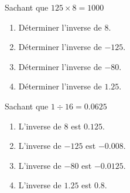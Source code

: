 \begin{exercice*}
    Sachant que $125\times 8 = \num{1000}$    
        \begin{enumerate}
            \item Déterminer l'inverse de $8$.
            \item Déterminer l'inverse de $-125$.
            \item Déterminer l'inverse de $-80$.
            \item Déterminer l'inverse de $\num{1.25}$.
        \end{enumerate}
\end{exercice*}
\begin{corrige}
    Sachant que $1\div 16 = \num{0.0625}$    
        \begin{enumerate}
            \item L'inverse de $8$ est $\num{0.125}$.
            \item L'inverse de $-125$ est $-\num{0.008}$.
            \item L'inverse de $-80$ est $-\num{0.0125}$.
            \item L'inverse de $\num{1.25}$ est $\num{0.8}$.
        \end{enumerate}
\end{corrige}


